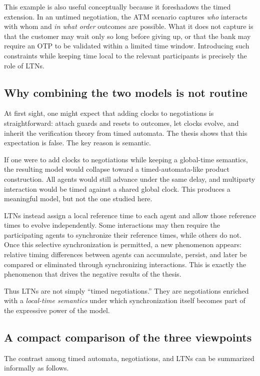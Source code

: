 This example is also useful conceptually because it foreshadows the timed extension. In an untimed negotiation, the ATM scenario captures \emph{who} interacts with whom and \emph{in what order} outcomes are possible. What it does not capture is that the customer may wait only so long before giving up, or that the bank may require an OTP to be validated within a limited time window. Introducing such constraints while keeping time local to the relevant participants is precisely the role of LTNs.

\subsection{Why combining the two models is not routine}

At first sight, one might expect that adding clocks to negotiations is straightforward: attach guards and resets to outcomes, let clocks evolve, and inherit the verification theory from timed automata. The thesis shows that this expectation is false. The key reason is semantic.

If one were to add clocks to negotiations while keeping a global-time semantics, the resulting model would collapse toward a timed-automata-like product construction. All agents would still advance under the same delay, and multiparty interaction would be timed against a shared global clock. This produces a meaningful model, but not the one studied here.

LTNs instead assign a local reference time to each agent and allow those reference times to evolve independently. Some interactions may then require the participating agents to synchronize their reference times, while others do not. Once this selective synchronization is permitted, a new phenomenon appears: relative timing differences between agents can accumulate, persist, and later be compared or eliminated through synchronizing interactions. This is exactly the phenomenon that drives the negative results of the thesis.

Thus LTNs are not simply ``timed negotiations.'' They are negotiations enriched with a \emph{local-time semantics} under which synchronization itself becomes part of the expressive power of the model.

\subsection{A compact comparison of the three viewpoints}

The contrast among timed automata, negotiations, and LTNs can be summarized informally as follows.


